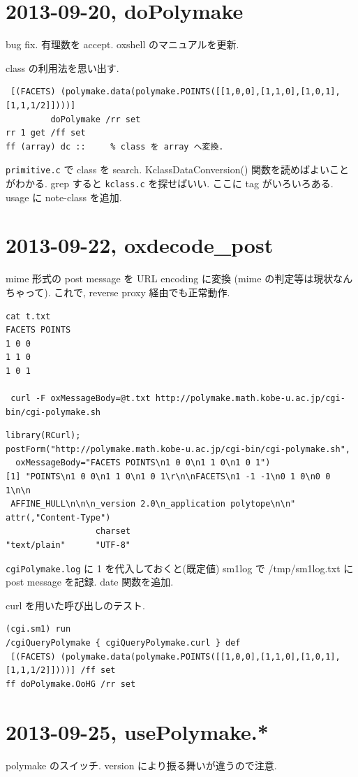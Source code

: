 \documentclass{jarticle}
\begin{document}
\section{2013-09-20, doPolymake}
bug fix. 有理数を accept. oxshell のマニュアルを更新.

class の利用法を思い出す.
\begin{verbatim}
 [(FACETS) (polymake.data(polymake.POINTS([[1,0,0],[1,1,0],[1,0,1],[1,1,1/2]])))]
         doPolymake /rr set 
rr 1 get /ff set
ff (array) dc ::     % class を array へ変換.
\end{verbatim}
{\tt primitive.c} で class を search.
KclassDataConversion() 関数を読めばよいことがわかる.
grep すると {\tt kclass.c} を探せばいい.
ここに tag がいろいろある.
usage に note-class を追加.

\section{2013-09-22, oxdecode\_post}

mime 形式の post message を URL encoding に変換
(mime の判定等は現状なんちゃって).
これで, reverse proxy 経由でも正常動作.

\begin{verbatim}
cat t.txt
FACETS POINTS
1 0 0
1 1 0
1 0 1

 curl -F oxMessageBody=@t.txt http://polymake.math.kobe-u.ac.jp/cgi-bin/cgi-polymake.sh
\end{verbatim}

\begin{verbatim}
library(RCurl);
postForm("http://polymake.math.kobe-u.ac.jp/cgi-bin/cgi-polymake.sh",
  oxMessageBody="FACETS POINTS\n1 0 0\n1 1 0\n1 0 1")
[1] "POINTS\n1 0 0\n1 1 0\n1 0 1\r\n\nFACETS\n1 -1 -1\n0 1 0\n0 0 1\n\n
 AFFINE_HULL\n\n\n_version 2.0\n_application polytope\n\n"
attr(,"Content-Type")
                  charset 
"text/plain"      "UTF-8" 
\end{verbatim}

{\tt cgiPolymake.log} に 1 を代入しておくと(既定値)
sm1log で /tmp/sm1log.txt に post message を記録.
date 関数を追加.

curl を用いた呼び出しのテスト.
\begin{verbatim}
(cgi.sm1) run
/cgiQueryPolymake { cgiQueryPolymake.curl } def
 [(FACETS) (polymake.data(polymake.POINTS([[1,0,0],[1,1,0],[1,0,1],[1,1,1/2]])))] /ff set
ff doPolymake.OoHG /rr set
\end{verbatim}

\section{2013-09-25, usePolymake.*}
polymake のスイッチ. version により振る舞いが違うので注意.
\end{document}
